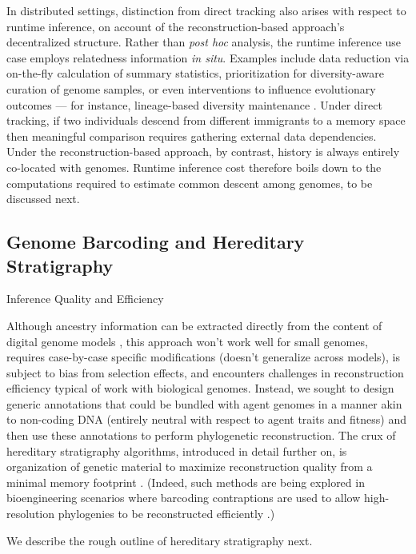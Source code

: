In distributed settings, distinction from direct tracking also arises with respect to runtime inference, on account of the reconstruction-based approach's decentralized structure.
Rather than \textit{post hoc} analysis, the runtime inference use case employs relatedness information \textit{in situ}.
Examples include data reduction via on-the-fly calculation of summary statistics, prioritization for diversity-aware curation of genome samples, or even interventions to influence evolutionary outcomes --- for instance, lineage-based diversity maintenance \citep{TODO}.
Under direct tracking, if two individuals descend from different immigrants to a memory space then meaningful comparison requires gathering external data dependencies.
Under the reconstruction-based approach, by contrast, history is always entirely co-located with genomes.
Runtime inference cost therefore boils down to the computations required to estimate common descent among genomes, to be discussed next.

\subsection{Genome Barcoding and Hereditary Stratigraphy}


Inference Quality and Efficiency

Although ancestry information can be extracted directly from the content of digital genome models \citep{TODOOEE4}, this approach won't work well for small genomes, requires case-by-case specific modifications (doesn't generalize across models), is subject to bias from selection effects, and encounters challenges in reconstruction efficiency typical of work with biological genomes.
Instead, we sought to design generic annotations that could be bundled with agent genomes in a manner akin to non-coding DNA (entirely neutral with respect to agent traits and fitness) and then use these annotations to perform phylogenetic reconstruction.
The crux of hereditary stratigraphy algorithms, introduced in detail further on, is organization of genetic material to maximize reconstruction quality from a minimal memory footprint \citep{moreno2022hereditary}.
(Indeed, such methods are being explored in bioengineering scenarios where barcoding contraptions are used to allow high-resolution phylogenies to be reconstructed efficiently \citep{TODO}.)

We describe the rough outline of hereditary stratigraphy next.

